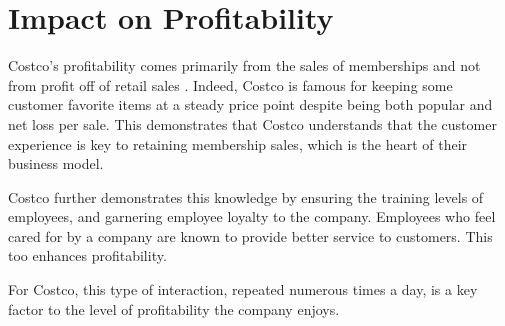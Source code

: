 \documentclass[man]{apa7}
\begin{document}
\section{Impact on Profitability}
\label{sec:org5b56fa1}

Costco's profitability comes primarily from the sales of memberships and not from profit off of retail sales \parencite{foxbusinessHowDoesCostco2020,costcoINVESTORRELATIONSOVERVIEW}. Indeed, Costco is famous for keeping some customer favorite items at a steady price point despite being both popular and net loss per sale. This demonstrates that Costco understands that the customer experience is key to retaining membership sales, which is the heart of their business model.

Costco further demonstrates this knowledge by ensuring the training levels of employees, and garnering employee loyalty to the company. Employees who feel cared for by a company are known to provide better service to customers. This too enhances profitability.

For Costco, this type of interaction, repeated numerous times a day, is a key factor to the level of profitability the company enjoys.

\printbibliography
\end{document}
